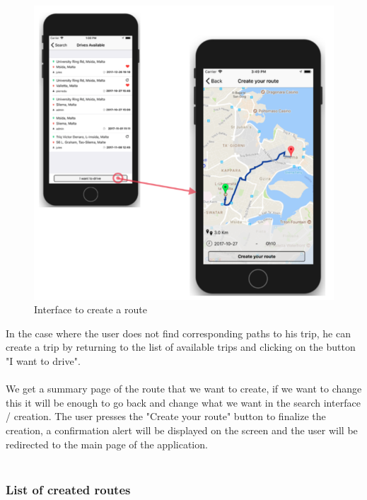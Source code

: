 \begin{figure}[h!]
\begin{center}
\includegraphics[scale = 0.3]{diagrams/CreateRoute.png} 
\end{center}
\caption{Interface to create a route}
\end{figure}
In the case where the user does not find corresponding paths to his trip, he can create a trip by returning to the list of available trips and clicking on the button "I want to drive".
\\\\
We get a summary page of the route that we want to create, if we want to change this it will be enough to go back and change what we want in the search interface / creation. The user presses the "Create your route" button to finalize the creation, a confirmation alert will be displayed on the screen and the user will be redirected to the main page of the application.
\\\\

\subsubsection{List of created routes}

